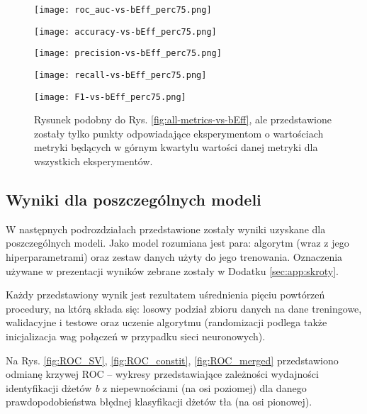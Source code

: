 \begin{figure}[h]
	\centering
	\texttt{[image: roc\_auc-vs-bEff\_perc75.png]} 
	
	\vspace{-1.5em}
	\texttt{[image: accuracy-vs-bEff\_perc75.png]}
	
	\vspace{-1.5em}
	\texttt{[image: precision-vs-bEff\_perc75.png]}
	
	\vspace{-1.5em}
	\texttt{[image: recall-vs-bEff\_perc75.png]}
	
	\vspace{-1.2em}
	\texttt{[image: F1-vs-bEff\_perc75.png]}
	
	\caption{Rysunek podobny do Rys. \ref{fig:all-metrics-vs-bEff}, ale przedstawione zostały tylko punkty odpowiadające eksperymentom o wartościach metryki będących w górnym kwartylu wartości danej metryki dla wszystkich eksperymentów.}
	\label{fig:all-metrics-vs-bEff_perc75}
\end{figure}


\clearpage
\FloatBarrier
\subsection{Wyniki dla poszczególnych modeli}

W następnych podrozdziałach przedstawione zostały wyniki uzyskane dla poszczególnych modeli. Jako model rozumiana jest para: algorytm (wraz z jego hiperparametrami) oraz zestaw danych użyty do jego trenowania. Oznaczenia używane w prezentacji wyników zebrane zostały w Dodatku \ref{sec:app:skroty}. 

Każdy przedstawiony wynik jest rezultatem uśrednienia pięciu powtórzeń procedury, na którą składa się: losowy podział zbioru danych na dane treningowe, walidacyjne i testowe oraz uczenie algorytmu (randomizacji podlega także inicjalizacja wag połączeń w przypadku sieci neuronowych).

Na Rys. \ref{fig:ROC_SV}, \ref{fig:ROC_constit}, \ref{fig:ROC_merged} przedstawiono odmianę krzywej ROC -- wykresy przedstawiające zależności wydajności identyfikacji dżetów \textit{b} z niepewnościami (na osi poziomej) dla danego prawdopodobieństwa błędnej klasyfikacji dżetów tła (na osi pionowej). 

